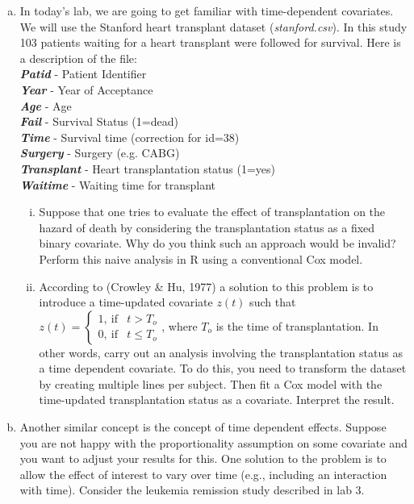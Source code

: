 \begin{enumerate}[(a)]
\item In today's lab, we are going to get familiar with time-dependent covariates. We will
use the Stanford heart transplant dataset (\emph{stanford.csv}). In this study 103 patients waiting
for a heart transplant were followed for survival. Here is a description of the file:\\
\textbf{\emph{Patid}} - Patient Identifier \\
\textbf{\emph{Year}} - Year of Acceptance \\
\textbf{\emph{Age}} - Age \\
\textbf{\emph{Fail}} - Survival Status (1=dead) \\
\textbf{\emph{Time}} -  Survival time (correction for id=38) \\
\textbf{\emph{Surgery}} - Surgery (e.g. CABG) \\
\textbf{\emph{Transplant}} - Heart transplantation status (1=yes) \\
 \textbf{\emph{Waitime}} - Waiting time for transplant
\begin{enumerate}[(i)]
\item Suppose that one tries to evaluate the effect of transplantation on the hazard of death by considering the transplantation status as a fixed binary covariate. Why do you think such an approach would be invalid?
Perform this naive analysis in R using a conventional Cox model.
\item According to (Crowley \& Hu, 1977) a solution to this problem is to introduce a time-updated covariate $z(t)$ such that $z(t) = \begin{cases}
1, \ \text{if} & t>T_{o} \\
0, \ \text{if} & t\leq T_{o}
\end{cases}$, where $T_{o}$ is the time of transplantation. In other words, carry out an analysis involving the transplantation status as a time dependent covariate. To do this, you need to transform the dataset by creating multiple lines per subject. Then fit a Cox model with the time-updated transplantation status as a covariate. Interpret the result. 
\end{enumerate}
\item Another similar concept is the concept of time dependent effects. Suppose you are not happy with the proportionality assumption on some covariate and you want to adjust your results for this. One solution to the problem is to allow the effect of interest to vary over time (e.g., including an interaction with time). Consider the leukemia remission study described in lab 3.

\end{enumerate}
